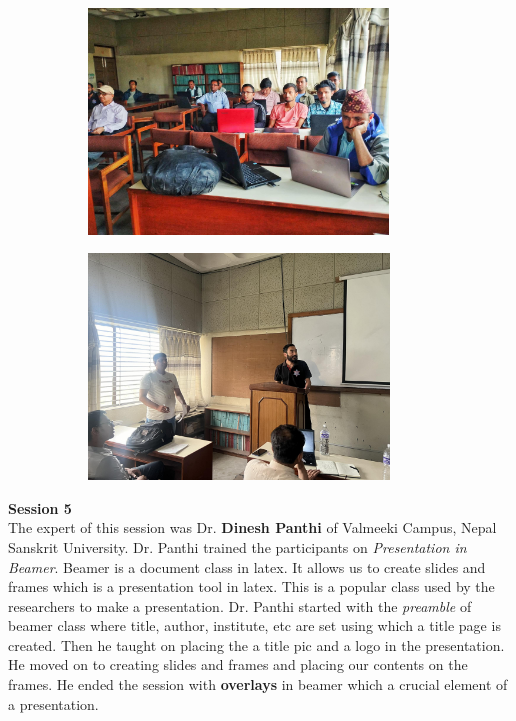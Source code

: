 \message{ !name(latexworkhop_report.tex)}\documentclass[a4paper,12pt]{report}
\begin{document}
\begin{figure}[h!]
\centering
\begin{subfigure}{0.48\textwidth}
    \includegraphics[height=6cm, width=\textwidth]{santosh.jpg}
\end{subfigure}
\hfill
\begin{subfigure}{0.48\textwidth}
    \includegraphics[height=6cm, width=\textwidth]{sandesh2.jpg}
\end{subfigure}
\end{figure}

\vspace{7mm}
{\bfseries \large Session 5}\\[3mm]
The expert of this session was Dr. \textbf{Dinesh Panthi} of Valmeeki Campus, Nepal Sanskrit University. Dr. Panthi trained the participants on \textit{Presentation in Beamer}. Beamer is a document class in latex. It allows us to create slides and frames which is a presentation tool in latex. This is a popular class used by the researchers to make a presentation. Dr. Panthi started with the \textit{preamble} of beamer class where title, author, institute, etc are set using which a title page is created. Then he taught on placing the a title pic and a logo in the presentation. He moved on to creating slides and frames and placing our contents on the frames. He ended the session with \textbf{overlays} in beamer which a crucial element of a presentation.
\clearpage
\end{document}
